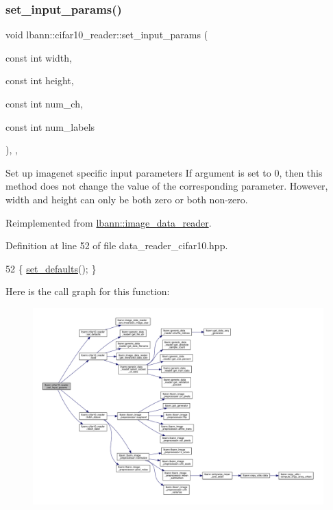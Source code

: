\subsubsection{\texorpdfstring{set\+\_\+input\+\_\+params()}{set\_input\_params()}}
{\footnotesize\ttfamily void lbann\+::cifar10\+\_\+reader\+::set\+\_\+input\+\_\+params (\begin{DoxyParamCaption}\item[{const int}]{width,  }\item[{const int}]{height,  }\item[{const int}]{num\+\_\+ch,  }\item[{const int}]{num\+\_\+labels }\end{DoxyParamCaption})\hspace{0.3cm}{\ttfamily [inline]}, {\ttfamily [override]}, {\ttfamily [virtual]}}

Set up imagenet specific input parameters If argument is set to 0, then this method does not change the value of the corresponding parameter. However, width and height can only be both zero or both non-\/zero. 

Reimplemented from \hyperlink{classlbann_1_1image__data__reader_a6ed9b8b12ad3ffa93ad458d872f8c044}{lbann\+::image\+\_\+data\+\_\+reader}.



Definition at line 52 of file data\+\_\+reader\+\_\+cifar10.\+hpp.


\begin{DoxyCode}
52 \{ \hyperlink{classlbann_1_1cifar10__reader_a4c5389d0a6641716c96aa07e58fa4e88}{set\_defaults}(); \}
\end{DoxyCode}
Here is the call graph for this function\+:\nopagebreak
\begin{figure}[H]
\begin{center}
\leavevmode
\includegraphics[width=350pt]{classlbann_1_1cifar10__reader_a3915005f1278a840869b8519c30c808b_cgraph}
\end{center}
\end{figure}


